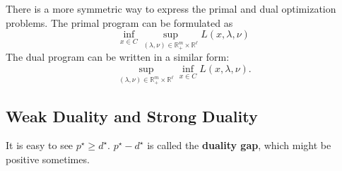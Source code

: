 \documentclass[openany]{book}
\theoremstyle{definition}
\theoremstyle{remark}
\begin{document}
There is a more symmetric way to express the primal and dual optimization problems. The primal program can be formulated as
\begin{equation}\label{maxminPrimal}
\inf_{x\in C}\sup_{(\lambda,\nu)\in\mathbb{R}_+^m\times\mathbb{R}^{\ell}}L(x,\lambda,\nu)
\end{equation}
The dual program can be written in a similar form:
\begin{equation}\label{maxminDual}
\sup_{(\lambda,\nu)\in\mathbb{R}_+^m\times\mathbb{R}^{\ell}}\inf_{x\in C}L(x,\lambda,\nu).
\end{equation}

\subsection{Weak Duality and Strong Duality}
It is easy to see $p^{\star}\ge d^{\star}$. $p^{\star}-d^{\star}$ is called the \textbf{duality gap}, which might be positive sometimes.
\end{document}
